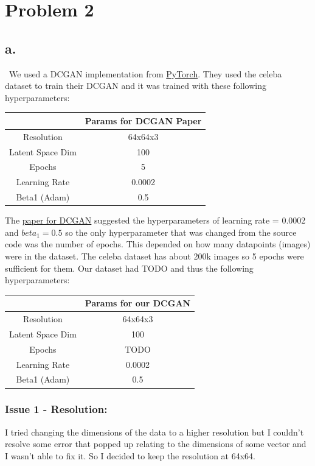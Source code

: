 \documentclass{article}
\begin{document}
\section*{Problem 2}
\subsection*{a.}
\
We used a DCGAN implementation from \href{https://pytorch.org/tutorials/beginner/dcgan_faces_tutorial.html}{PyTorch}.
They used the celeba dataset to train their DCGAN
and it was trained with these following hyperparameters:
\begin{center}
\begin{tabular}{|c|c|}
\hline
& Params for DCGAN Paper \\ \hline
Resolution & 64x64x3 \\ \hline
Latent Space Dim & 100 \\ \hline
Epochs & 5 \\ \hline
Learning Rate & 0.0002 \\ \hline
Beta1 (Adam) & 0.5 \\ \hline
\end{tabular}
\end{center}

The \href{https://arxiv.org/pdf/1511.06434.pdf}{paper for DCGAN} suggested the
hyperparameters of learning rate = 0.0002 and $beta_1=0.5$ so
the only hyperparameter that was changed from the source code was the number of epochs.
This depended on how many datapoints (images) were in the dataset. The celeba dataset
has about 200k images so 5 epochs were sufficient for them. Our dataset had
TODO and thus the following hyperparameters:
\begin{center}
\begin{tabular}{|c|c|}
\hline
& Params for our DCGAN \\ \hline
Resolution & 64x64x3 \\ \hline
Latent Space Dim & 100 \\ \hline
Epochs & TODO \\ \hline
Learning Rate & 0.0002 \\ \hline
Beta1 (Adam) & 0.5 \\ \hline
\end{tabular}
\end{center}

\subsubsection*{Issue 1 - Resolution:}
I tried changing the dimensions of the data to a higher resolution but I couldn't resolve some error that popped up relating
to the dimensions of some vector and I wasn't able to fix it. So I decided to
keep the resolution at 64x64.
\end{document}
